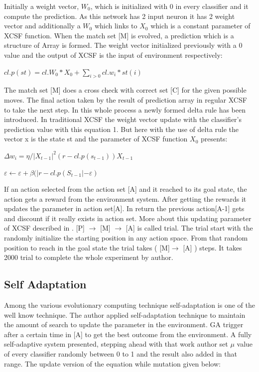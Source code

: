 \documentclass[12pt]{article}
\begin{document}
Initially a weight vector, $W_0$, which is initialized with 0 in every classifier and it compute the prediction. As this network has 2 input neuron it has 2 weight vector and additionally a $W_0$ which links to $X_0$ which is a constant parameter of XCSF function. When the match set [M] is evolved, a prediction which is a structure of Array is formed. The weight vector initialized previously with a 0 value and the output of XCSF is the input of environment respectively: 

\begin{center} $cl.p(st) = cl.W_0*X_0 + \sum_{i>0} cl.w_i*st(i)$
\end{center}
The match set [M] does a cross check with correct set [C] for the given possible moves. The final action taken by the result of prediction array in regular XCSF to take the next step. In this whole process a newly formed delta rule has been introduced. In traditional XCSF the weight vector update with the classifier’s prediction value with this equation 1. But here with the use of delta rule the vector x is the state st and the parameter of XCSF function $X_0$ presents: 

\begin{center} $\Delta w_i = \eta / |X_{t - 1}|^2(r-cl.p(s_{t-1}))X_{t-1}$
\end{center}

\begin{center} $\varepsilon \leftarrow \varepsilon + \beta (| r-cl.p(S_{t-1}|-\varepsilon )$
\end{center}
If an action selected from the action set [A] and it reached to its goal state, the action gets a reward from the environment system. After getting the rewards it updates the parameter in action set[A]. In return the previous action[A-1] gets and discount if it really exists in action set. More about this updating parameter of XCSF described in \cite{WilsonPrediction2001FunctionAW}.
[P] $\rightarrow$ [M] $\rightarrow$ [A] is called trial.  The trial start with the randomly initialize the starting position in any action space. From that random position to reach in the goal state the trial takes ( [M]$\rightarrow$ [A] ) steps. It takes 2000 trial to complete the whole experiment by author.

\subsection{Self Adaptation }
\label{sec:2}
Among the various evolutionary computing technique self-adaptation is one of the well know technique. The author applied self-adaptation technique to maintain the amount of search to update the parameter in the environment.  GA trigger after a certain time in [A] to get the best outcome from the environment. A fully self-adaptive system presented, stepping ahead with that work author set $\mu$ value of every classifier randomly between 0 to 1 and the result also added in that range. The update version of the equation while mutation given below: 
\end{document}
